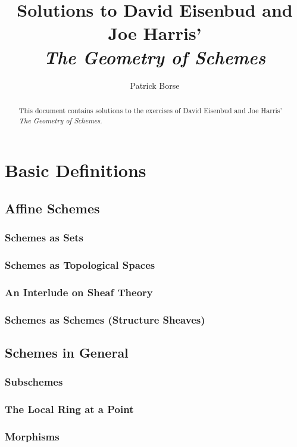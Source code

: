 \documentclass[oneside]{amsbook}
\title{Solutions to David Eisenbud and Joe Harris'\\ \emph{The Geometry of Schemes}}
\author{Patrick Borse}
\numberwithin{ex}{chapter}
\begin{document}
\begin{abstract}
This document contains solutions to the exercises of David Eisenbud and Joe Harris' \emph{The Geometry of Schemes}.
\end{abstract}

\maketitle

\tableofcontents

\chapter{Basic Definitions}
\section{Affine Schemes}
\subsection{Schemes as Sets}

\subsection{Schemes as Topological Spaces}

\subsection{An Interlude on Sheaf Theory}

\subsection{Schemes as Schemes (Structure Sheaves)}


\section{Schemes in General}
\subsection{Subschemes}

\subsection{The Local Ring at a Point}

\subsection{Morphisms}

\end{document}

